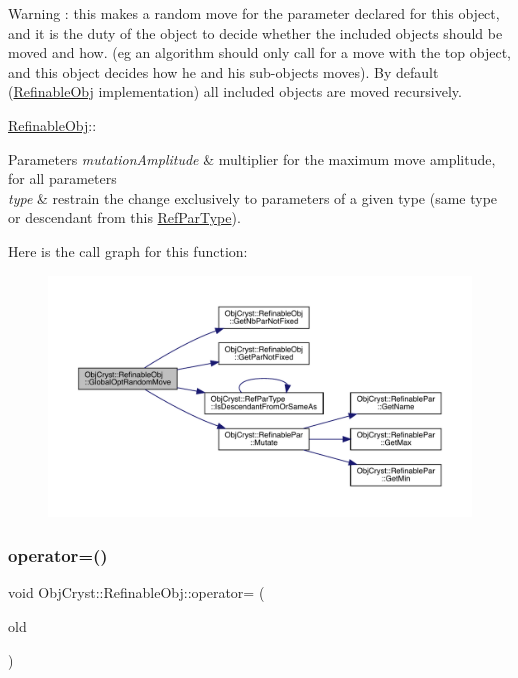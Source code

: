 \begin{DoxyWarning}{Warning}
\+: this makes a random move for the parameter declared for this object, and it is the duty of the object to decide whether the included objects should be moved and how. (eg an algorithm should only call for a move with the top object, and this object decides how he and his sub-\/objects moves). By default (\mbox{\hyperlink{class_obj_cryst_1_1_refinable_obj}{Refinable\+Obj}} implementation) all included objects are moved recursively.
\end{DoxyWarning}
\mbox{\hyperlink{class_obj_cryst_1_1_refinable_obj}{Refinable\+Obj}}\+:\+: 
\begin{DoxyParams}{Parameters}
{\em mutation\+Amplitude} & multiplier for the maximum move amplitude, for all parameters \\
\hline
{\em type} & restrain the change exclusively to parameters of a given type (same type or descendant from this \mbox{\hyperlink{class_obj_cryst_1_1_ref_par_type}{Ref\+Par\+Type}}). \\
\hline
\end{DoxyParams}
Here is the call graph for this function\+:
\nopagebreak
\begin{figure}[H]
\begin{center}
\leavevmode
\includegraphics[width=350pt]{class_obj_cryst_1_1_refinable_obj_afcbc5dbf18eca074efa669ba9f51502f_cgraph}
\end{center}
\end{figure}
\mbox{\label{class_obj_cryst_1_1_refinable_obj_ab9b15adff1092f15e8f06cfeecc314f8}} 
\subsubsection{\texorpdfstring{operator=()}{operator=()}}
{\footnotesize\ttfamily void Obj\+Cryst\+::\+Refinable\+Obj\+::operator= (\begin{DoxyParamCaption}\item[{const \mbox{\hyperlink{class_obj_cryst_1_1_refinable_obj}{Refinable\+Obj}} \&}]{old }\end{DoxyParamCaption})}

